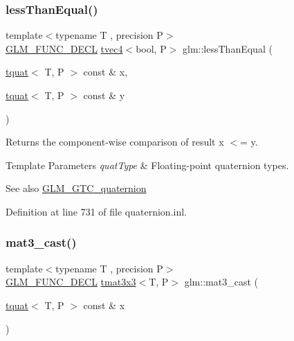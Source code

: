 \subsubsection{\texorpdfstring{lessThanEqual()}{lessThanEqual()}}
{\footnotesize\ttfamily template$<$typename T , precision P$>$ \\
\mbox{\hyperlink{setup_8hpp_ab2d052de21a70539923e9bcbf6e83a51}{G\+L\+M\+\_\+\+F\+U\+N\+C\+\_\+\+D\+E\+CL}} \mbox{\hyperlink{structglm_1_1tvec4}{tvec4}}$<$bool, P$>$ glm\+::less\+Than\+Equal (\begin{DoxyParamCaption}\item[{\mbox{\hyperlink{structglm_1_1tquat}{tquat}}$<$ T, P $>$ const \&}]{x,  }\item[{\mbox{\hyperlink{structglm_1_1tquat}{tquat}}$<$ T, P $>$ const \&}]{y }\end{DoxyParamCaption})}

Returns the component-\/wise comparison of result x $<$= y.


\begin{DoxyTemplParams}{Template Parameters}
{\em quat\+Type} & Floating-\/point quaternion types.\\
\hline
\end{DoxyTemplParams}
\begin{DoxySeeAlso}{See also}
\mbox{\hyperlink{group__gtc__quaternion}{G\+L\+M\+\_\+\+G\+T\+C\+\_\+quaternion}} 
\end{DoxySeeAlso}


Definition at line 731 of file quaternion.\+inl.

\mbox{\label{group__gtc__quaternion_gae04c39422eb4e450ec8c4f45a1057b40}} 
\subsubsection{\texorpdfstring{mat3\_cast()}{mat3\_cast()}}
{\footnotesize\ttfamily template$<$typename T , precision P$>$ \\
\mbox{\hyperlink{setup_8hpp_ab2d052de21a70539923e9bcbf6e83a51}{G\+L\+M\+\_\+\+F\+U\+N\+C\+\_\+\+D\+E\+CL}} \mbox{\hyperlink{structglm_1_1tmat3x3}{tmat3x3}}$<$T, P$>$ glm\+::mat3\+\_\+cast (\begin{DoxyParamCaption}\item[{\mbox{\hyperlink{structglm_1_1tquat}{tquat}}$<$ T, P $>$ const \&}]{x }\end{DoxyParamCaption})}

